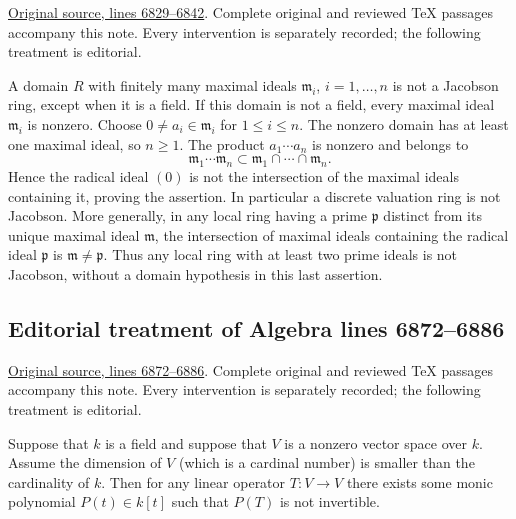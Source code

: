 \hypertarget{algebra-context-059}{}

\noindent\href{https://github.com/stacks/stacks-project/blob/a04446e57ec1fbc252a871afcec7752fb2807b14/algebra.tex\#L6829}{Original source, lines 6829--6842}. Complete original and reviewed TeX passages accompany this note. Every intervention is separately recorded; the following treatment is editorial.


\begin{example}
\label{editorial-source-example-not-jacobson}
A domain $R$ with finitely many maximal ideals
$\mathfrak m_i$, $i = 1, \ldots, n$ is not a
Jacobson ring, except when it is a field.
If this domain is not a field, every maximal ideal $\mathfrak m_i$
is nonzero. Choose $0\ne a_i\in\mathfrak m_i$ for $1\leq i\leq n$.
The nonzero domain has at least one maximal ideal, so $n\geq1$.
The product $a_1\cdots a_n$ is nonzero and belongs to
$$
\mathfrak m_1\cdots\mathfrak m_n
\subset\mathfrak m_1\cap\cdots\cap\mathfrak m_n.
$$
Hence the radical ideal $(0)$ is not the intersection of the maximal
ideals containing it, proving the assertion. In particular a discrete
valuation ring is not Jacobson. More generally, in any local ring
having a prime $\mathfrak p$ distinct from its unique maximal ideal
$\mathfrak m$, the intersection of maximal ideals containing the
radical ideal $\mathfrak p$ is $\mathfrak m\ne\mathfrak p$.
Thus any local ring with at least two prime ideals is not Jacobson,
without a domain hypothesis in this last assertion.
\end{example}


\subsection{Editorial treatment of Algebra lines 6872--6886}

\hypertarget{algebra-context-060}{}

\noindent\href{https://github.com/stacks/stacks-project/blob/a04446e57ec1fbc252a871afcec7752fb2807b14/algebra.tex\#L6872}{Original source, lines 6872--6886}. Complete original and reviewed TeX passages accompany this note. Every intervention is separately recorded; the following treatment is editorial.


\begin{lemma}
\label{editorial-source-lemma-dimension}
Suppose that $k$ is a field and suppose that $V$ is a nonzero vector
space over $k$. Assume the dimension of $V$ (which is a cardinal number)
is smaller than the cardinality of $k$. Then for any linear operator
$T : V \to V$ there exists some monic polynomial $P(t) \in k[t]$ such that
$P(T)$ is not invertible.
\end{lemma}

